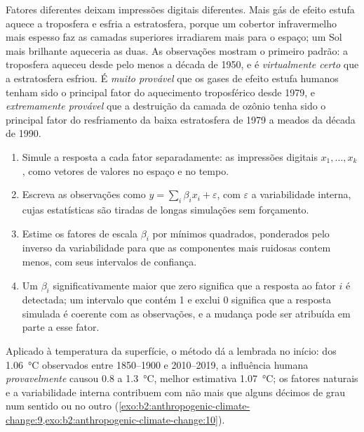 Fatores diferentes deixam impressões digitais diferentes. Mais gás de efeito estufa aquece a troposfera e esfria
a estratosfera, porque um cobertor infravermelho mais espesso faz as camadas superiores irradiarem mais para o espaço;
um Sol mais brilhante aqueceria as duas. As observações mostram o primeiro padrão: a troposfera aqueceu
desde pelo menos a década de 1950, e é \emph{virtualmente certo} que a estratosfera esfriou. É
\emph{muito provável} que os gases de efeito estufa humanos tenham sido o principal fator do aquecimento troposférico
desde 1979, e \emph{extremamente provável} que a destruição da camada de ozônio tenha sido o principal fator do
resfriamento da baixa estratosfera de 1979 a meados da década de 1990.

\begin{method}\label{met:b2:anthropogenic-climate-change:fingerprinting}
\begin{enumerate}
  \item Simule a resposta a cada fator separadamente: as impressões digitais $x_1, \dots, x_k$, como
        vetores de valores no espaço e no tempo.
  \item Escreva as observações como $y = \sum_i \beta_i x_i + \varepsilon$, com $\varepsilon$ a
        variabilidade interna, cujas estatísticas são tiradas de longas simulações sem forçamento.
  \item Estime os fatores de escala $\beta_i$ por mínimos quadrados, ponderados pelo inverso da
        variabilidade para que as componentes mais ruidosas contem menos, com seus intervalos de confiança.
  \item Um $\beta_i$ significativamente maior que zero significa que a resposta ao fator $i$ é
        detectada; um intervalo que contém 1 e exclui 0 significa que a resposta simulada é
        coerente com as observações, e a mudança pode ser atribuída em parte a esse fator.
\end{enumerate}
\end{method}

Aplicado à temperatura da superfície, o método dá a  lembrada no início: dos
\qty{1.06}{\celsius} observados entre 1850--1900 e 2010--2019, a influência humana \emph{provavelmente}
causou 0.8 a \qty{1.3}{\celsius}, melhor estimativa \qty{1.07}{\celsius}; os fatores naturais e a
variabilidade interna contribuem com não mais que alguns décimos de grau num sentido ou no outro
(\cref{exo:b2:anthropogenic-climate-change:9,exo:b2:anthropogenic-climate-change:10}).

